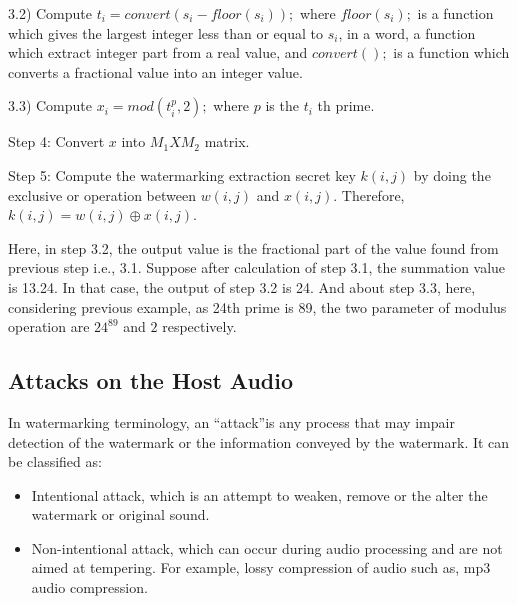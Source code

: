 \documentclass[12pt,a4paper]{report}
\begin{document}
\bigskip

\hspace{10mm}3.2) Compute $ t_{i} = convert( s_{i} - floor(s_{i}) ); $ where $ floor(s_{i}); $ is a function which gives the largest integer less than or equal to $ s_{i} $, in a word, a function which extract integer part from a real value, and $ convert(); $ is a function which converts a fractional value into an integer value.

\bigskip

\hspace{10mm}3.3) Compute $ x_{i} =  mod(t_i^p,2); $ where $p$ is the $t_{i}$ th prime. %

\bigskip

Step 4:
Convert $x$ into $M_{1}XM_{2}$ matrix.

\bigskip

Step 5:
Compute the watermarking extraction secret key $ k(i,j) $ by doing the exclusive or operation between $w(i,j)$ and $x(i,j)$. Therefore, $ k(i,j) = w(i,j) \oplus x(i,j). $

\bigskip

Here, in step 3.2, the output value is the fractional part of the value found from previous step i.e., 3.1. Suppose after calculation of step 3.1, the summation value is 13.24. In that case, the output of step 3.2 is 24. And about step 3.3, here, considering previous example, as 24th prime is 89, the two parameter of modulus operation are $ 24^{89} $ and $ 2 $ respectively.

\subsection{Attacks on the Host Audio}

In watermarking terminology, an \textquotedblleft attack\textquotedblright is any process that may impair detection of the watermark or the information conveyed by the watermark. It can be classified as:

\begin{itemize}

\item Intentional attack, which is an attempt to weaken, remove or the alter the watermark or original sound.

\item Non-intentional attack, which can occur during audio processing and are not aimed at tempering. For example, lossy compression of audio such as, mp3 audio compression.

\end{itemize}
\end{document}
